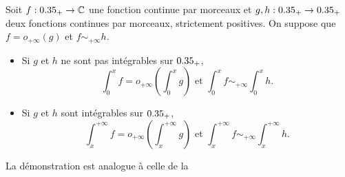 \begin{prop}{}
    Soit $f: 0.35_+ \rightarrow \mathbb{C}$ une fonction continue par morceaux et $g, h:0.35_+ \rightarrow 0.35_+$ deux fonctions continues par morceaux, strictement positives. On suppose que $f = o_{+\infty}(g)$ et $f \sim_{+\infty} h$.\\
    \begin{itemize}
        \item Si $g$ et $h$ ne sont pas intégrables sur $0.35_+$,
        $$\int_{0}^{x} f = o_{+\infty} \left(\int_{0}^{x} g \right) \text{ et } \int_{0}^{x} f \sim_{+\infty} \int_{0}^{x} h.$$
        \item Si $g$ et $h$ sont intégrables sur $0.35_+$,
        $$\int_{x}^{+\infty} f = o_{+\infty} \left(\int_{x}^{+\infty} g \right) \text{ et } \int_{x}^{+\infty} f \sim_{+\infty} \int_{x}^{+\infty} h.$$
    \end{itemize}
\end{prop} 

La démonstration est analogue à celle de la 
